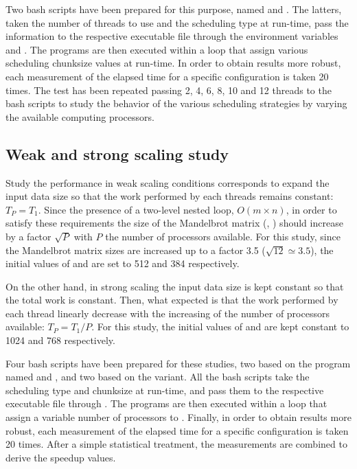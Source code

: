 Two bash scripts have been prepared for this purpose, named  and . The latters, taken the number of threads to use and the scheduling type at run-time, pass the information to the respective executable file through the environment variables  and . The programs are then executed within a loop that assign various scheduling chunksize values at run-time. In order to obtain results more robust, each measurement of the elapsed time for a specific configuration is taken 20 times. The test has been repeated passing 2, 4, 6, 8, 10 and 12 threads to the bash scripts to study the behavior of the various scheduling strategies by varying the available computing processors.

\subsection{Weak and strong scaling study}\label{sec:method-scale}
Study the performance in weak scaling conditions corresponds to expand the input data size so that the work performed by each threads remains constant: $T_P = T_1$. Since the presence of a two-level nested loop, $O(m \times n)$, in order to satisfy these requirements the size of the Mandelbrot matrix (, ) should increase by a factor $\sqrt{P}$ with $P$ the number of processors available. For this study, since the Mandelbrot matrix sizes are increased up to a factor 3.5 ($\sqrt{12} \simeq 3.5$), the initial values of  and  are set to 512 and 384 respectively.

On the other hand, in strong scaling the input data size is kept constant so that the total work is constant. Then, what expected is that the work performed by each thread linearly decrease with the increasing of the number of processors available: $T_P = T_1 / P$. For this study, the initial values of  and  are kept constant to 1024 and 768 respectively. 

Four bash scripts have been prepared for these studies, two based on the  program named  and , and two based on the  variant. All the bash scripts take the scheduling type and chunksize at run-time, and pass them to the respective executable file through . The programs are then executed within a loop that assign a variable number of processors to . Finally, in order to obtain results more robust, each measurement of the elapsed time for a specific configuration is taken 20 times. After a simple statistical treatment, the measurements are combined to derive the speedup values.